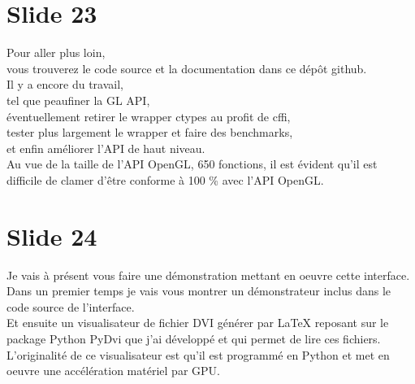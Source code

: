 \documentclass[12pt]{article}
\begin{document}
\section{Slide 23}

\noindent%
Pour aller plus loin, \\
vous trouverez le code source et la documentation dans ce dépôt github. \\

\noindent%
Il y a encore du travail, \\
tel que peaufiner la GL API, \\
éventuellement retirer le wrapper ctypes au profit de cffi, \\
tester plus largement le wrapper et faire des benchmarks, \\
et enfin améliorer l'API de haut niveau. \\

\noindent%
Au vue de la taille de l'API OpenGL, 650 fonctions, il est évident qu'il est difficile de clamer
d'être conforme à 100 \% avec l'API OpenGL.

\section{Slide 24}

\noindent%
Je vais à présent vous faire une démonstration mettant en oeuvre cette interface. \\

\noindent%
Dans un premier temps je vais vous montrer un démonstrateur inclus dans le code source de l'interface. \\

\noindent%
Et ensuite un visualisateur de fichier DVI générer par LaTeX reposant sur le package Python PyDvi
que j'ai développé et qui permet de lire ces fichiers. L'originalité de ce visualisateur est qu'il est
programmé en Python et met en oeuvre une accélération matériel par GPU.
\end{document}
